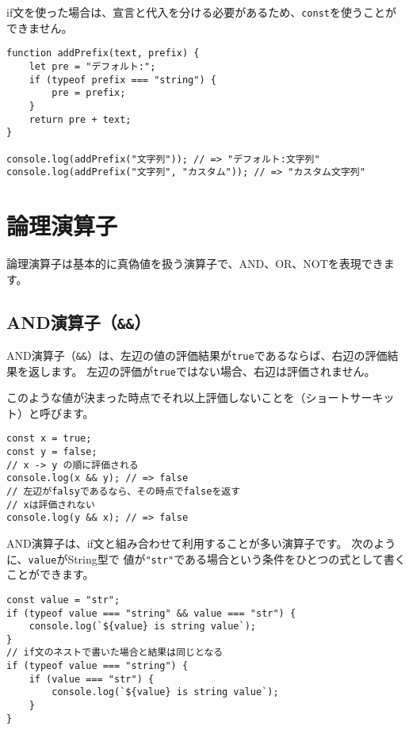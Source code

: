 if文を使った場合は、宣言と代入を分ける必要があるため、\texttt{const}を使うことができません。

\begin{lstlisting}
function addPrefix(text, prefix) {
    let pre = "デフォルト:";
    if (typeof prefix === "string") {
        pre = prefix;
    }
    return pre + text;
}

console.log(addPrefix("文字列")); // => "デフォルト:文字列"
console.log(addPrefix("文字列", "カスタム")); // => "カスタム文字列"
\end{lstlisting}

\hypertarget{logical-operator}{%
\section{論理演算子}\label{logical-operator}}

論理演算子は基本的に真偽値を扱う演算子で、AND、OR、NOTを表現できます。

\hypertarget{and-operator}{%
\subsection{\texorpdfstring{AND演算子（\texttt{\&\&}）}{AND演算子（\&\&）}}\label{and-operator}}

AND演算子（\texttt{\&\&}）は、左辺の値の評価結果が\texttt{true}であるならば、右辺の評価結果を返します。
左辺の評価が\texttt{true}ではない場合、右辺は評価されません。

このような値が決まった時点でそれ以上評価しないことを\textbf{}（ショートサーキット）と呼びます。

\begin{lstlisting}
const x = true;
const y = false;
// x -> y の順に評価される
console.log(x && y); // => false
// 左辺がfalsyであるなら、その時点でfalseを返す
// xは評価されない
console.log(y && x); // => false
\end{lstlisting}

AND演算子は、if文と組み合わせて利用することが多い演算子です。
次のように、\texttt{value}がString型で \textbf{}
値が\texttt{"str"}である場合という条件をひとつの式として書くことができます。

\begin{lstlisting}
const value = "str";
if (typeof value === "string" && value === "str") {
    console.log(`${value} is string value`);
}
// if文のネストで書いた場合と結果は同じとなる
if (typeof value === "string") {
    if (value === "str") {
        console.log(`${value} is string value`);
    }
}
\end{lstlisting}

